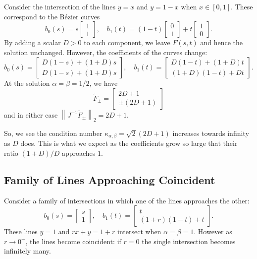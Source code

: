 \documentclass[3p, authoryear, square]{elsarticle}
\theoremstyle{definition}
\begin{document}
Consider the intersection of the lines \(y = x\) and \(y = 1 - x\) when
\(x \in \left[0, 1\right]\). These correspond to the B\'{e}zier curves
\begin{equation}
b_0(s) = s \left[ \begin{array}{c} 1 \\ 1 \end{array}\right], \quad
b_1(t) = (1 - t) \left[ \begin{array}{c} 0 \\ 1 \end{array}\right] +
t \left[ \begin{array}{c} 1 \\ 0 \end{array}\right].
\end{equation}
By adding a scalar \(D > 0\) to each component, we leave \(F(s, t)\) and hence
the solution unchanged. However, the coefficients of the curves change:
\begin{equation}
b_0(s) = \left[ \begin{array}{c} D(1 - s) + (1 + D)s \\ D(1 - s) + (1 + D)s
  \end{array}\right], \quad b_1(t) = \left[ \begin{array}{c}
  D(1 - t) + (1 + D)t \\ (1 + D)(1 - t) + Dt \end{array}\right].
\end{equation}
At the solution \(\alpha = \beta = 1/2\), we have
\begin{equation}
\widetilde{F}_{\pm} = \left[ \begin{array}{c} 2D + 1 \\ \pm(2D + 1)
  \end{array}\right]
\end{equation}
and in either case \(\left \lVert J^{-1} \widetilde{F}_{\pm} \right \rVert_2 =
2D + 1\).

So, we see the condition number \(\kappa_{\alpha, \beta} = \sqrt{2}(2D + 1)\)
increases towards infinity as \(D\) does. This is what we expect as the
coefficients grow so large that their ratio \((1 + D) / D\) approaches \(1\).

\subsection{Family of Lines Approaching Coincident}

Consider a family of intersections in which one of the lines approaches the
other:
\begin{equation}
b_0(s) = \left[ \begin{array}{c} s \\ 1 \end{array}\right], \quad
b_1(t) = \left[ \begin{array}{c} t \\ (1 + r)(1 - t) + t \end{array}\right].
\end{equation}
These lines \(y = 1\) and \(rx + y = 1 + r\) intersect when
\(\alpha = \beta = 1\). However as \(r \longrightarrow 0^+\), the lines
become coincident: if \(r = 0\) the single intersection becomes infinitely
many.
\end{document}
